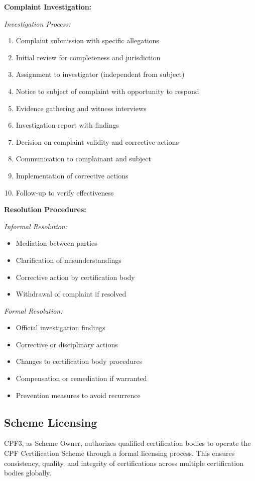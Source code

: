 \documentclass[11pt,a4paper]{article}
\begin{document}
\textbf{Complaint Investigation:}

\textit{Investigation Process:}
\begin{enumerate}
\item Complaint submission with specific allegations
\item Initial review for completeness and jurisdiction
\item Assignment to investigator (independent from subject)
\item Notice to subject of complaint with opportunity to respond
\item Evidence gathering and witness interviews
\item Investigation report with findings
\item Decision on complaint validity and corrective actions
\item Communication to complainant and subject
\item Implementation of corrective actions
\item Follow-up to verify effectiveness
\end{enumerate}

\textbf{Resolution Procedures:}

\textit{Informal Resolution:}
\begin{itemize}
\item Mediation between parties
\item Clarification of misunderstandings
\item Corrective action by certification body
\item Withdrawal of complaint if resolved
\end{itemize}

\textit{Formal Resolution:}
\begin{itemize}
\item Official investigation findings
\item Corrective or disciplinary actions
\item Changes to certification body procedures
\item Compensation or remediation if warranted
\item Prevention measures to avoid recurrence
\end{itemize}

\subsection{Scheme Licensing}

CPF3, as Scheme Owner, authorizes qualified certification bodies to operate the CPF Certification Scheme through a formal licensing process. This ensures consistency, quality, and integrity of certifications across multiple certification bodies globally.
\end{document}
